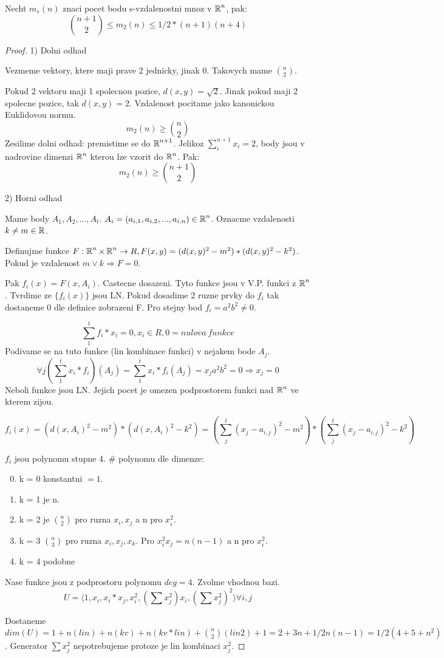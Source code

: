 \begin{theorem}
Necht $m_s(n)$ znaci pocet bodu s-vzdalenostni mnoz v $\operatorname{\mathbb{R}}^n$, pak:
\[ \binom{n+1}{2} \leq m_2(n) \leq 1/2 * (n+1)(n+4) \]
\end{theorem}
\begin{proof}
	1) Dolni odhad

	Vezmeme vektory, ktere maji prave 2 jednicky, jinak 0. Takovych mame $\binom{n}{2}$.

	Pokud 2 vektoru maji 1 spolecnou pozice, $d(x,y) = \sqrt{2}$. Jinak pokud maji 2 spolecne pozice, tak $d(x,y) = 2$. Vzdalenost pocitame jako kanonickou Euklidovou normu.
	\[ m_2(n) \geq \binom{n}{2} \]
	Zesilime dolni odhad: premistime se do $\operatorname{\mathbb{R}}^{n+1}$. Jelikoz $ \sum_i^{n+1} x_i = 2 $, body jsou v nadrovine dimenzi $\operatorname{\mathbb{R}}^n$ kterou lze vzorit do $\operatorname{\mathbb{R}}^n$. Pak:
	\[ m_2(n) \geq \binom{n + 1}{2} \]

	2) Horni odhad

	Mame body $A_1, A_2, ..., A_t$. $A_i = (a_{i,1}, a_{i,2}, ..., a_{i,n}) \in \operatorname{\mathbb{R}}^n$. Oznacme vzdalenosti $k \ne m \in \operatorname{\mathbb{R}}$.

	Definujme funkce $F : \operatorname{\mathbb{R}}^n \times \operatorname{\mathbb{R}}^n \to R, F(x,y) = (d(x,y)^2 - m^2) * (d(x,y)^2 - k^2)$. Pokud je vzdalenost $m \lor k \Rightarrow F = 0$.

	Pak $f_i(x) = F(x, A_i).$ Castecne dosazeni. Tyto funkce jsou v V.P. funkci z $\operatorname{\mathbb{R}}^n$. Tvrdime ze $\{ f_i(x)\}$ jsou LN.
	Pokud dosadime 2 ruzne prvky do $f_i$ tak dostaneme 0 dle definice zobrazeni F. Pro stejny bod $f_i = a^2b^2 \ne 0$.

	\[ \sum_1^t f_i * x_i = 0, x_i \in R, 0 = nulova \ funkce \]
	Podivame se na tuto funkce (lin kombinace funkci) v nejakem bode $A_j$.
	\[ \forall j (\sum_1^t x_i * f_i)(A_j) = \sum_1^t x_i * f_i(A_j) = x_j a^2 b^2 = 0 \Rightarrow x_j = 0 \]
	Neboli funkce jsou LN. Jejich pocet je omezen podprostorem funkci nad $\operatorname{\mathbb{R}}^n$ ve kterem zijou.

	\[ f_i(x) = (d(x,A_i)^2 - m^2) * (d(x,A_i)^2 - k^2) = (\sum_j^t(x_j - a_{i,j})^2 - m^2)*(\sum_j^t(x_j - a_{i,j})^2 - k^2)\]

	$f_i$ jsou polynomu stupne 4. \# polynomu dle dimenze:
	\begin{enumerate}
		\setcounter{enumii}{-1}
		\item k = 0 konstantni $ = 1$.
		\item k = 1 je n.
		\item k = 2 je $\binom{n}{2}$ pro ruzna $x_i, x_j$ a n pro $x_i^2$.
		\item k = 3 $\binom{n}{3}$ pro ruzna $x_i, x_j, x_k$. Pro $x_i^2x_j = n(n-1)$ a n pro $x_i^2$.
		\item k = 4 podobne
	\end{enumerate}
	Nase funkce jsou z podprostoru polynomu $deg = 4$. Zvolme vhodnou bazi.
	\[ U = \langle 1, x_i, x_i*x_j, x_i^2, (\sum x_j^2)x_i, (\sum x_j^2)^2 \rangle \forall i,j \]

	Dostaneme $dim(U) = 1 + n (lin) + n (kv) + n (kv * lin) + \binom{n}{2} (lin 2) + 1 = 2 + 3n + 1/2 n (n-1) = 1/2 (4 + 5 + n^2)$. Generator $\sum x_j^2$ nepotrebujeme protoze je lin kombinaci $x_j^2$.

\end{proof}
